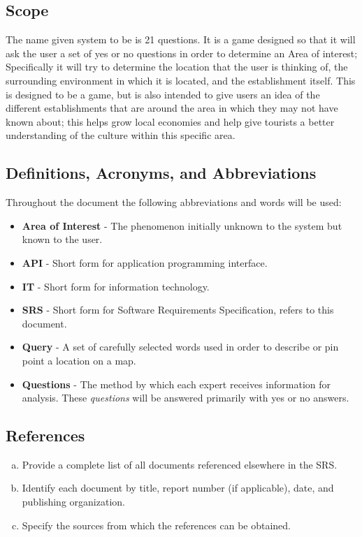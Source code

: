\documentclass[titlepage]{article}
\begin{document}
		
		\subsection{Scope}
		\label{sub:scope}
		
		The name given system to be is 21 questions. It is a game designed so that it will ask the user a set of yes or no questions in order to determine an Area of interest; Specifically it will try to determine the location that the user is thinking of, the surrounding environment in which it is located, and the establishment itself. This is designed to be a game, but is also intended to give users an idea of the different establishments that are around the area in which they may not have known about; this helps grow local economies and help give tourists a better understanding of the culture within this specific area. 
		
		\subsection{Definitions, Acronyms, and Abbreviations}
		\label{sub:definitions_acronyms_and_abbreviations}
		Throughout  the document the following abbreviations and words will be used:
		\begin{itemize}
			\item \textbf{Area of Interest} - The phenomenon initially unknown to the system but known to the user.
			\item \textbf{API} - Short form for application programming interface.
			\item \textbf{IT} - Short form for information technology.
			\item \textbf{SRS} - Short form for Software Requirements Specification, refers to this document.
			\item \textbf{Query} - A set of carefully selected words used in order to describe or pin point a location on a map.
			\item \textbf{Questions} - The method by which each expert receives information for analysis. These \textit{questions} will be answered primarily with yes or no answers.
			
		\end{itemize}
		
		\subsection{References}
		\label{sub:references}
		\begin{enumerate}[a)]
			\item Provide a complete list of all documents referenced elsewhere in the SRS.
			\item Identify each document by title, report number (if applicable), date, and publishing organization.
			\item Specify the sources from which the references can be obtained.
		\end{enumerate}
		
\end{document}
